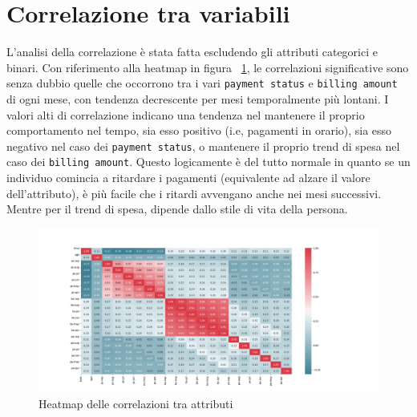 \section{Correlazione tra variabili}
L'analisi della correlazione \`e stata fatta escludendo
gli attributi categorici e binari. Con riferimento alla 
heatmap in figura ~\ref{heatmap}, le correlazioni significative
sono senza dubbio quelle che occorrono tra i vari \texttt{payment status}
e \texttt{billing amount} di ogni mese, con tendenza decrescente per mesi
temporalmente pi\`u lontani. I valori alti di correlazione indicano una
tendenza nel mantenere il proprio comportamento nel tempo, sia esso positivo
(i.e, pagamenti in orario), sia esso
negativo nel caso dei \texttt{payment status}, o mantenere il proprio trend di spesa
nel caso dei \texttt{billing amount}.
Questo logicamente \`e del tutto normale in quanto se un individuo comincia a ritardare
i pagamenti (equivalente ad alzare il valore dell'attributo), \`e pi\`u facile che
i ritardi avvengano anche nei mesi successivi.
Mentre per il trend di spesa, dipende dallo stile di vita della persona.

\begin{figure}[h]
\centering
  \includegraphics[width=.7\linewidth]{img/heatmap.png}
  \caption{Heatmap delle correlazioni tra attributi}
  \label{heatmap}
\end{figure}
